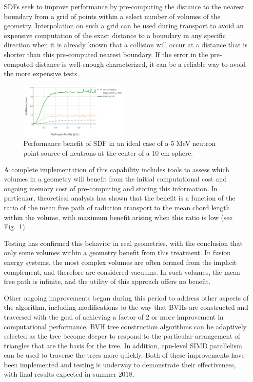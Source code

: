\glspl{SDF} seek to improve performance by pre-computing the distance to the
nearest boundary from a grid of points within a select number of volumes of
the geometry.  Interpolation on such a grid can be used during transport to
avoid an expensive computation of the exact distance to a boundary in any
specific direction when it is already known that a collision will occur at a
distance that is shorter than this pre-computed nearest boundary.  If the
error in the pre-computed distance is well-enough characterized, it can be a
reliable way to avoid the more expensive tests.

\begin{figure}
\centering
\includegraphics[width=0.48\textwidth]{imgs/sdf-best-case.png}
\caption{\label{fig:sdf-best-case}Performance benefit of \gls{SDF} in an ideal
  case of a 5 MeV neutron point source of neutrons at the center of a 10 cm
  sphere.}
\end{figure}

A complete implementation of this capability includes tools to assess which
volumes in a geometry will benefit from the initial computational cost and
ongoing memory cost of pre-computing and storing this information.  In
particular, theoretical analysis has shown that the benefit is a function of
the ratio of the mean free path of radiation transport to the mean chord
length within the volume, with maximum benefit arising when this ratio is
low (see Fig.\ \ref{fig:sdf-best-case}).

Testing has confirmed this behavior in real geometries, with the conclusion
that only some volumes within a geometry benefit from this treatment.  In
fusion energy systems, the most complex volumes are often formed from the
implicit complement, and therefore are considered vacuums.  In such volumes,
the mean free path is infinite, and the utility of this approach offers no
benefit.

Other ongoing improvements began during this period to address other aspects
of the algorithm, including modifications to the way that \glspl{BVH} are
constructed and traversed with the goal of achieving a factor of 2 or more
improvement in computational performance.  \gls{BVH} tree construction
algorithms can be adaptively selected as the tree become deeper to respond to
the particular arrangement of triangles that are the basis for the tree.  In
addition, cpu-level \gls{SIMD} parallelism can be used to traverse the trees
more quickly. Both of these improvements have been
implemented and testing is underway to demonstrate their effectiveness, with
final results expected in summer 2018.

